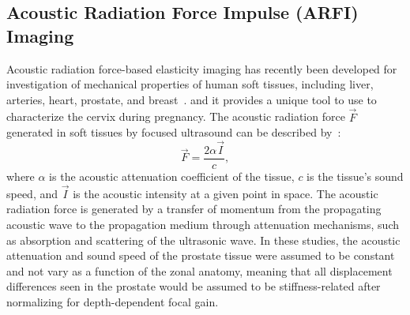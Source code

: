 \subsection{Acoustic Radiation Force Impulse (ARFI) Imaging}
Acoustic radiation force-based elasticity imaging has recently been developed
for investigation of mechanical properties of human soft tissues, including
liver, arteries, heart, prostate, and
breast~\cite{Bouchard2009,Dumont2009,Trahey2004,Dahl2009,proc_congdon04,Palmeri2011,Zhai2010a,hsu07,Palmeri2011a}.
and it provides a unique tool to use to characterize the cervix during
pregnancy.  The acoustic radiation force $\vec{F}$ generated in soft tissues by
focused ultrasound can be described by~\cite{nyborg65,torr84}:
\begin{equation}
\vec{F} = \frac{2 \alpha \vec{I}}{c},
\label{eqn:radforce}
\end{equation}
where $\alpha$ is the acoustic attenuation coefficient of the tissue, $c$ is
the tissue's sound speed, and $\vec{I}$ is the acoustic intensity at a given
point in space.  The acoustic radiation force is generated by a transfer of
momentum from the propagating acoustic wave to the propagation medium through
attenuation mechanisms, such as absorption and scattering of the ultrasonic
wave.  In these studies, the acoustic attenuation and sound speed of the
prostate tissue were assumed to be constant and not vary as a function of the
zonal anatomy, meaning that all displacement differences seen in the prostate
would be assumed to be stiffness-related after normalizing for depth-dependent
focal gain.
